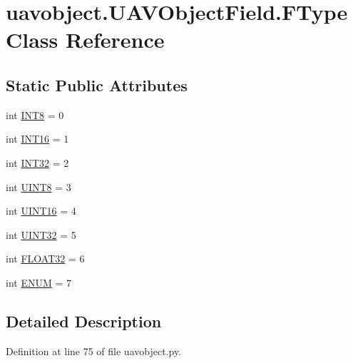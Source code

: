 \hypertarget{classuavobject_1_1_u_a_v_object_field_1_1_f_type}{\section{uavobject.\-U\-A\-V\-Object\-Field.\-F\-Type Class Reference}
\label{classuavobject_1_1_u_a_v_object_field_1_1_f_type}
}
\subsection*{Static Public Attributes}
\begin{DoxyCompactItemize}
\item 
int \hyperlink{classuavobject_1_1_u_a_v_object_field_1_1_f_type_ac5910f572723b877215aa253835b90c2}{I\-N\-T8} = 0
\item 
int \hyperlink{classuavobject_1_1_u_a_v_object_field_1_1_f_type_ad160d7505855cb0bc2119ad550a5ce74}{I\-N\-T16} = 1
\item 
int \hyperlink{classuavobject_1_1_u_a_v_object_field_1_1_f_type_aaf033821f6e501ae8e698056e7312ce0}{I\-N\-T32} = 2
\item 
int \hyperlink{classuavobject_1_1_u_a_v_object_field_1_1_f_type_a20bba7da25132a664e35afb509c88205}{U\-I\-N\-T8} = 3
\item 
int \hyperlink{classuavobject_1_1_u_a_v_object_field_1_1_f_type_a85cd16d14436cb2775e4896d3d6ded7c}{U\-I\-N\-T16} = 4
\item 
int \hyperlink{classuavobject_1_1_u_a_v_object_field_1_1_f_type_a2514c93432168fdbf6e3f514a1dc0e3f}{U\-I\-N\-T32} = 5
\item 
int \hyperlink{classuavobject_1_1_u_a_v_object_field_1_1_f_type_abbdf1e0897ffb96a8f9f131c9dd66949}{F\-L\-O\-A\-T32} = 6
\item 
int \hyperlink{classuavobject_1_1_u_a_v_object_field_1_1_f_type_a0a214155a61f3a4012a5a438f981e8da}{E\-N\-U\-M} = 7
\end{DoxyCompactItemize}


\subsection{Detailed Description}


Definition at line 75 of file uavobject.\-py.



